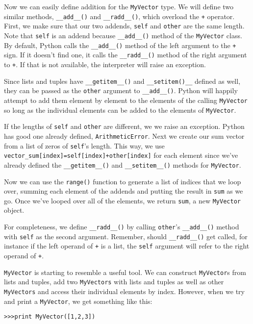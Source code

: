 Now we can easily define addition for the \verb|MyVector| type. We will define two similar methods, \verb|__add__()| and \verb|__radd__()|, which overload the \verb|+| operator. First, we make sure that our two addends, \verb|self| and \verb|other| are the same length. Note that \verb|self| is an addend because \verb|__add__()| method of the \verb|MyVector| class. By default, Python calls the \verb|__add__()| method of the left argument to the \verb|+| sign. If it doesn't find one, it calls the \verb|__radd__()| method of the right argument to \verb|+|. If that is not available, the interpreter will raise an exception.

Since lists and tuples have \verb|__getitem__()| and \verb|__setitem()__| defined as well, they  can be passed as the \verb|other| argument to \verb|__add__()|. Python will happily attempt to add them element by element to the elements of the calling \verb|MyVector| so long as the individual elements can be added to the elements of \verb|MyVector|.

If the lengths of \verb|self| and \verb|other| are different, we we raise an exception. Python has good one already defined, \verb|ArithmeticError|. Next we create our sum vector from a list of zeros of \verb|self|'s length. This way, we use \verb|vector_sum[index]=self[index]+other[index]| for each element since we've already defined the \verb|__getitem__()| and \verb|__setitem__()| methods for \verb|MyVector|.

Now we can use the \verb|range()| function to generate a list of indices that we loop over, summing each element of the addends and putting the result in \verb|sum| as we go. Once we've looped over all of the elements, we return \verb|sum|, a new \verb|MyVector| object.

For completeness, we define \verb|__radd__()| by calling \verb|other|'s \verb|__add__()| method with  \verb|self| as the second argument. Remember, should \verb|__radd__()| get called, for instance if the left operand of \verb|+| is a list, the \verb|self| argument will refer to the right operand of \verb|+|.

\verb|MyVector| is starting to resemble a useful tool. We can construct \verb|MyVector|s from lists and tuples, add two \verb|MyVectors| with lists and tuples as well as other \verb|MyVectors| and access their individual elements by index. However, when we try and print a \verb|MyVector|, we get something like this: 

\verb|>>>print MyVector([1,2,3])|


